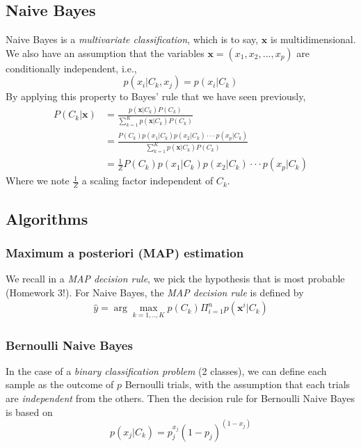 \documentclass[a4paper,12pt]{article}
\newcommand{\xx}{{\bm x}}
\begin{document}
\subsection{Naive Bayes}
Naive Bayes is a \textit{multivariate classification}, which is to say, $\xx$ is multidimensional. We also have an assumption that the variables $\xx = (x_1, x_2,...,x_p)$ are conditionally independent, i.e.,
$$p(x_i|C_k,x_j) = p(x_i|C_k)$$
By applying this property to Bayes' rule that we have seen previously,
\begin{align*}
P(C_k|\xx) &= \frac{p(\xx|C_k)P(C_k)}{\sum_{k=1}^{K}p(\xx|C_k)P(C_k)} \\
		   &= \frac{P(C_k)p(x_1|C_k)p(x_2|C_k)\cdot \cdot \cdot p(x_p|C_k)}{\sum_{k=1}^{K}p(\xx|C_k)P(C_k)}\\
           &= \frac{1}{Z}P(C_k)p(x_1|C_k)p(x_2|C_k)\cdot \cdot \cdot p(x_p|C_k)
\end{align*}
Where we note $\frac{1}{Z}$ a scaling factor independent of $C_k$. 
\subsection{Algorithms}
\subsubsection{Maximum a posteriori (MAP) estimation}
We recall in a \textit{MAP decision rule}, we pick the hypothesis that is most probable (Homework 3!). For Naive Bayes, the \textit{MAP decision rule} is defined by
\begin{align*}
\hat{y} = \arg \max\limits_{k=1,..,K}p(C_k) \Pi_{i=1}^n p(\xx^i|C_k) 
\end{align*}
\subsubsection{Bernoulli Naive Bayes}
In the case of a \textit{binary classification problem} (2 classes), we can define each sample as the outcome of $p$ Bernoulli trials, with the assumption that each trials are \textit{independent} from the others. Then the decision rule for Bernoulli Naive Bayes is based on
$$p(x_j|C_k) = p_j^{x_j}(1-p_j)^{(1-x_j)}$$
\end{document}
